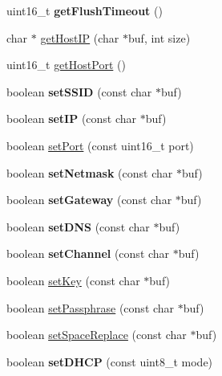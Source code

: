 \begin{DoxyCompactItemize}
\item 
\hypertarget{class_wi_fly_adc61e189a60fe155ce2c8a70b5ce53ad}{
uint16\-\_\-t {\bfseries get\-Flush\-Timeout} ()}
\label{class_wi_fly_adc61e189a60fe155ce2c8a70b5ce53ad}

\item 
char $\ast$ \hyperlink{class_wi_fly_a50a16eb3932125449e67643697c4fca8}{get\-Host\-I\-P} (char $\ast$buf, int size)
\item 
uint16\-\_\-t \hyperlink{class_wi_fly_add5ef6940763d8b4326c2e530bf81a73}{get\-Host\-Port} ()
\item 
\hypertarget{class_wi_fly_a98582c4205dedcd16e2c4fc6931808f5}{
boolean {\bfseries set\-S\-S\-I\-D} (const char $\ast$buf)}
\label{class_wi_fly_a98582c4205dedcd16e2c4fc6931808f5}

\item 
\hypertarget{class_wi_fly_af1aa5ce536ba66a3b3218f3139700937}{
boolean {\bfseries set\-I\-P} (const char $\ast$buf)}
\label{class_wi_fly_af1aa5ce536ba66a3b3218f3139700937}

\item 
boolean \hyperlink{class_wi_fly_ab9e31e9faafe941dc2777f023ae332b6}{set\-Port} (const uint16\-\_\-t port)
\item 
\hypertarget{class_wi_fly_a1ea02a8a8e9bb455187b5b2fee368f56}{
boolean {\bfseries set\-Netmask} (const char $\ast$buf)}
\label{class_wi_fly_a1ea02a8a8e9bb455187b5b2fee368f56}

\item 
\hypertarget{class_wi_fly_ac602867b84b0920044b9ed82f8560f00}{
boolean {\bfseries set\-Gateway} (const char $\ast$buf)}
\label{class_wi_fly_ac602867b84b0920044b9ed82f8560f00}

\item 
\hypertarget{class_wi_fly_a4cecfc4bd7a4292e9f40fd4374ca9c72}{
boolean {\bfseries set\-D\-N\-S} (const char $\ast$buf)}
\label{class_wi_fly_a4cecfc4bd7a4292e9f40fd4374ca9c72}

\item 
\hypertarget{class_wi_fly_abfacc21f7fb2e8b1cf4b0d64e42a1cf2}{
boolean {\bfseries set\-Channel} (const char $\ast$buf)}
\label{class_wi_fly_abfacc21f7fb2e8b1cf4b0d64e42a1cf2}

\item 
boolean \hyperlink{class_wi_fly_acbf5067803dd7e371ae3fcdbb68e7936}{set\-Key} (const char $\ast$buf)
\item 
boolean \hyperlink{class_wi_fly_a73216bb0fe3d30b076fcf7f7dd02ef7e}{set\-Passphrase} (const char $\ast$buf)
\item 
boolean \hyperlink{class_wi_fly_a6e59a2453a7aa87f99477e1032e5cbcb}{set\-Space\-Replace} (const char $\ast$buf)
\item 
\hypertarget{class_wi_fly_adba5d55e320ab647b905e39edc8030ff}{
boolean {\bfseries set\-D\-H\-C\-P} (const uint8\-\_\-t mode)}
\label{class_wi_fly_adba5d55e320ab647b905e39edc8030ff}


\end{DoxyCompactItemize}
